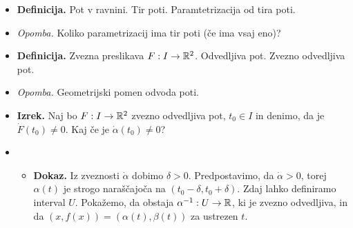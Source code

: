 \begin{enumerate}
\begin{itemize}
        \item \colorbox{purple!30}{\textbf{Definicija.}} Pot v ravnini. Tir poti. Paramtetrizacija od tira poti.
        \item \colorbox{yellow!30}{\emph{Opomba.}} Koliko parametrizacij ima tir poti (če ima vsaj eno)?
        \item \colorbox{purple!30}{\textbf{Definicija.}} Zvezna preslikava $F: I \to \mathbb{R}^2$. Odvedljiva pot. Zvezno odvedljiva pot.
        \item \colorbox{yellow!30}{\emph{Opomba.}} Geometrijski pomen odvoda poti.
        \item \colorbox{blue!30}{\textbf{Izrek.}} Naj bo $F: I \to \mathbb{R}^2$ zvezno odvedljiva pot, $t_0 \in I$ in denimo, da je $\dot{F}(t_0) \neq 0$. Kaj če je $\dot{\alpha}(t_0) \neq 0$?
        \item \begin{itemize}
            \item \colorbox{green!30}{\textbf{Dokaz.}} Iz zveznosti $\dot{\alpha}$ dobimo $\delta > 0$. Predpostavimo, da $\dot{\alpha} > 0$, torej $\alpha (t)$ je strogo naraščajoča na $(t_0 - \delta, t_0 + \delta)$. Zdaj lahko definiramo interval $U$. Pokažemo, da obstaja $\alpha^{-1}: U \to \mathbb{R}$, ki je zvezno odvedljiva, in da $(x, f(x)) = (\alpha (t), \beta (t))$ za ustrezen $t$.
            

\end{itemize}
\end{itemize}
\end{enumerate}
